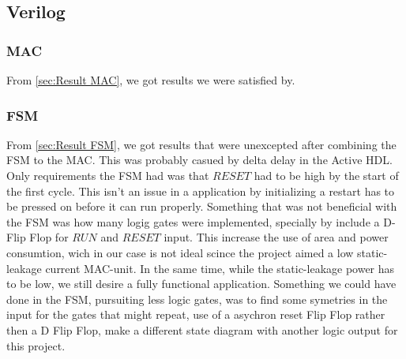  \subsection{Verilog}
 \subsubsection{MAC}
 From \ref{sec:Result MAC}, we got results we were satisfied by.
 \subsubsection{FSM}
 From \ref{sec:Result FSM}, we got results that were unexcepted after combining the FSM to the MAC. This was probably casued by delta delay in the Active HDL. Only requirements the FSM had was that $RESET$ had to be high by the start of the first cycle. This isn't an issue in a application by initializing a restart has to be pressed on before it can run properly. Something that was not beneficial with the FSM was how many logig gates were implemented, specially by include a D- Flip Flop for $RUN$ and $RESET$ input. This increase the use of area and power consumtion, wich in our case is not ideal scince the project aimed a low static-leakage current MAC-unit. In the same time, while the static-leakage power has to be low, we still desire a fully functional application. Something we could have done in the FSM, pursuiting less logic gates, was to find some symetries in the input for the gates that might repeat, use of a asychron reset Flip Flop rather then a D Flip Flop, make a different state diagram with another logic output for this project.